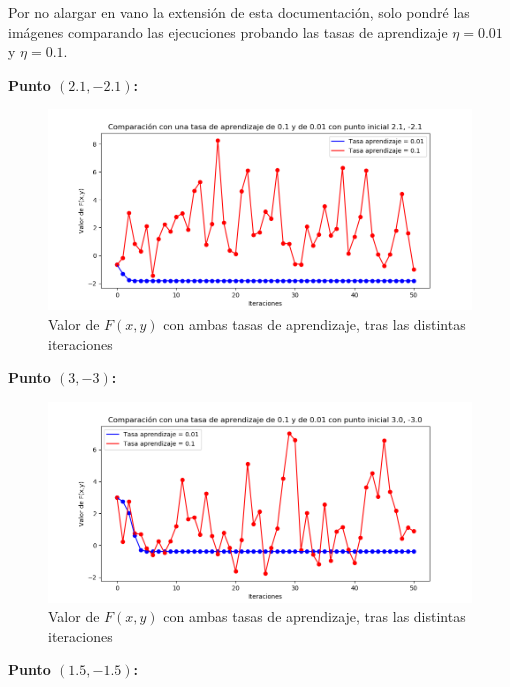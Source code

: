 \documentclass[12pt, spanish]{article}
\begin{document}
Por no alargar en vano la extensión de esta documentación, solo pondré las imágenes comparando las ejecuciones probando las tasas de aprendizaje $\eta = 0.01$ y $\eta = 0.1$.

\newpage

\textbf{Punto $(2.1, -2.1)$:}

\begin{figure}[H]
  \centering
      \includegraphics[scale = 0.70]{ej1-3-21-21.png}
 		 \caption{Valor de $F(x,y)$ con ambas tasas de aprendizaje, tras las distintas iteraciones}
  		\label{fig:ej1-3-21-21}

\end{figure}


\textbf{Punto $(3, -3)$:}

\begin{figure}[H]
  \centering
      \includegraphics[scale = 0.70]{ej1-3-3-3.png}
 		 \caption{Valor de $F(x,y)$ con ambas tasas de aprendizaje, tras las distintas iteraciones}
  		\label{fig:ej1-3-3-3}

\end{figure}

\newpage

\textbf{Punto $(1.5, -1.5)$:}
\end{document}
